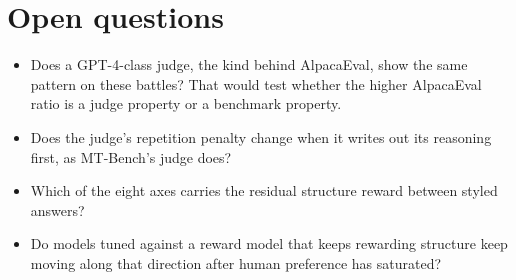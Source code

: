 \documentclass[11pt]{article}
\begin{document}
\section{Open questions}
\begin{itemize}
\item Does a GPT-4-class judge, the kind behind AlpacaEval, show the same pattern on these battles? That would test whether the higher AlpacaEval ratio is a judge property or a benchmark property.
\item Does the judge's repetition penalty change when it writes out its reasoning first, as MT-Bench's judge does?
\item Which of the eight axes carries the residual structure reward between styled answers?
\item Do models tuned against a reward model that keeps rewarding structure keep moving along that direction after human preference has saturated?
\end{itemize}

\appendix
\end{document}
